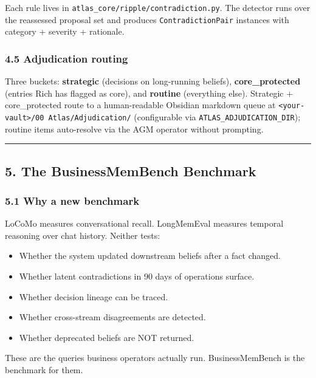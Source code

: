 \documentclass[
  11pt,
]{article}
\providecommand{\tightlist}{%
  \setlength{\itemsep}{0pt}\setlength{\parskip}{0pt}}
\begin{document}
Each rule lives in \texttt{atlas\_core/ripple/contradiction.py}. The
detector runs over the reassessed proposal set and produces
\texttt{ContradictionPair} instances with category + severity +
rationale.

\subsubsection{4.5 Adjudication routing}\label{adjudication-routing}

Three buckets: \textbf{strategic} (decisions on long-running beliefs),
\textbf{core\_protected} (entries Rich has flagged as core), and
\textbf{routine} (everything else). Strategic + core\_protected route to
a human-readable Obsidian markdown queue at
\texttt{<your-vault>/00\ Atlas/Adjudication/} (configurable via \texttt{ATLAS\_ADJUDICATION\_DIR}); routine items
auto-resolve via the AGM operator without prompting.

\begin{center}\rule{0.5\linewidth}{0.5pt}\end{center}

\subsection{5. The BusinessMemBench
Benchmark}\label{the-businessmembench-benchmark}

\subsubsection{5.1 Why a new benchmark}\label{why-a-new-benchmark}

LoCoMo measures conversational recall. LongMemEval measures temporal
reasoning over chat history. Neither tests:

\begin{itemize}
\tightlist
\item
  Whether the system updated downstream beliefs after a fact changed.
\item
  Whether latent contradictions in 90 days of operations surface.
\item
  Whether decision lineage can be traced.
\item
  Whether cross-stream disagreements are detected.
\item
  Whether deprecated beliefs are NOT returned.
\end{itemize}

These are the queries business operators actually run. BusinessMemBench
is the benchmark for them.
\end{document}
